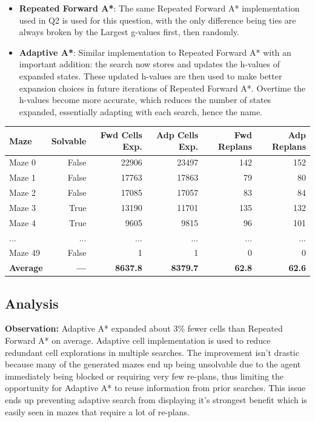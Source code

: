 \documentclass{article}
\begin{document}
\begin{itemize}
    \item \textbf{Repeated Forward A*}: The same Repeated Forward A* implementation used in Q2 is used for this question, with the only difference being ties are always broken by the Largest g-values first, then randomly.
    \item \textbf{Adaptive A*}: Similar implementation to Repeated Forward A* with an important addition: the search now stores and updates the h-values of expanded states. These updated h-values are then used to make better expansion choices in future iterations of Repeated Forward A*. Overtime the h-values become more accurate, which reduces the number of states expanded, essentially adapting with each search, hence the name. 
\end{itemize}

\begin{center}
\begin{tabular}{|l|r|r|r|r|r|}
\hline
\textbf{Maze} & \textbf{Solvable} & \textbf{Fwd Cells Exp.} & \textbf{Adp Cells Exp.} & \textbf{Fwd Replans} & \textbf{Adp Replans}\\
\hline
Maze 0  & False & 22906  & 23497 & 142 & 152 \\
Maze 1  & False & 17763 & 17863 & 79  & 80  \\
Maze 2  & False & 17085 & 17057 & 83  & 84  \\
Maze 3  & True  & 13190 & 11701 & 135 & 132 \\
Maze 4  & True  & 9605   & 9815  & 96  & 101 \\
... & ... & ... & ... & ... & ... \\
Maze 49 & False & 1     & 1      & 0   & 0   \\
\hline
\textbf{Average} & \textbf{---} & \textbf{8637.8} & \textbf{8379.7} & \textbf{62.8} & \textbf{62.6} \\
\hline
\end{tabular}
\end{center}

\subsection*{Analysis}
\textbf{Observation:} Adaptive A* expanded about 3\% fewer cells than Repeated Forward A* on average. Adaptive cell implementation is used to reduce redundant cell explorations in multiple searches. The improvement isn't drastic because many of the generated mazes end up being unsolvable due to the agent immediately being blocked or requiring very few re-plans, thus limiting the opportunity for Adaptive A* to reuse information from prior searches. This issue ends up preventing adaptive search from displaying it's strongest benefit which is easily seen in mazes that require a lot of re-plans. \\
\end{document}

